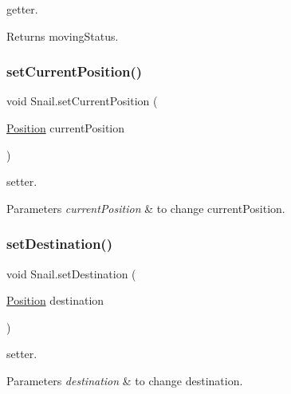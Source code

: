 getter. \begin{DoxyReturn}{Returns}
moving\+Status. 
\end{DoxyReturn}
\mbox{\label{class_snail_accd27e2c8c8fd9522eaaf07249e37401}} 
\subsubsection{\texorpdfstring{set\+Current\+Position()}{setCurrentPosition()}}
{\footnotesize\ttfamily void Snail.\+set\+Current\+Position (\begin{DoxyParamCaption}\item[{\mbox{\hyperlink{class_position}{Position}}}]{current\+Position }\end{DoxyParamCaption})\hspace{0.3cm}{\ttfamily [inline]}}

setter. 
\begin{DoxyParams}{Parameters}
{\em current\+Position} & to change current\+Position. \\
\hline
\end{DoxyParams}
\mbox{\label{class_snail_a238dee1b989badf9c6d915a5185a1a47}} 
\subsubsection{\texorpdfstring{set\+Destination()}{setDestination()}}
{\footnotesize\ttfamily void Snail.\+set\+Destination (\begin{DoxyParamCaption}\item[{\mbox{\hyperlink{class_position}{Position}}}]{destination }\end{DoxyParamCaption})\hspace{0.3cm}{\ttfamily [inline]}}

setter. 
\begin{DoxyParams}{Parameters}
{\em destination} & to change destination. \\
\hline
\end{DoxyParams}
\mbox{\label{class_snail_a0b09291bb1de38a10051f96d2415fd3e}} 
